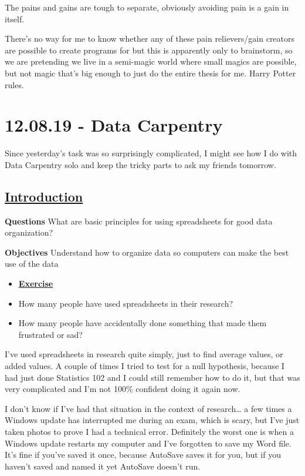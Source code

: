 \documentclass[12pt]{article}
\begin{document}
The pains and gains are tough to separate, obviously avoiding pain is a gain in itself.

There's no way for me to know whether any of these pain relievers/gain creators are possible to create programs for but this is apparently only to brainstorm, so we are pretending we live in a semi-magic world where small magics are possible, but not magic that's big enough to just do the entire thesis for me. Harry Potter rules.

\newpage
\section{12.08.19 - Data Carpentry}
Since yesterday’s task was so surprisingly complicated, I might see how I do with Data Carpentry solo and keep the tricky parts to ask my friends tomorrow.

\subsection{\textbf{\href{https://datacarpentry.org/spreadsheets-socialsci/00-intro/index.html}{Introduction}}}
\setlength{\parskip}{0.5em}


\color{Gray}\textbf{{Questions}}
\newline What are basic principles for using spreadsheets for good data organization?

\textbf{{Objectives}}
\newline Understand how to organize data so computers can make the best use of the data

\begin{itemize}
\renewcommand{\labelitemi}{$\nobullet$}
\item \textbf{\underline{Exercise}}
\renewcommand{\labelitemi}{$\bullet$}
    \item How many people have used spreadsheets in their research?
    \item How many people have accidentally done something that made them frustrated or sad?
\end{itemize}\color{black}

I’ve used spreadsheets in research quite simply, just to find average values, or added values. A couple of times I tried to test for a null hypothesis, because I had just done Statistics 102 and I could still remember how to do it, but that was very complicated and I’m not 100\% confident doing it again now.

I don’t know if I’ve had that situation in the context of research… a few times a Windows update has interrupted me during an exam, which is scary, but I’ve just taken photos to prove I had a technical error. Definitely the worst one is when a Windows update restarts my computer and I’ve forgotten to save my Word file. It’s fine if you’ve saved it once, because AutoSave saves it for you, but if you haven’t saved and named it yet AutoSave doesn’t run.
\end{document}
